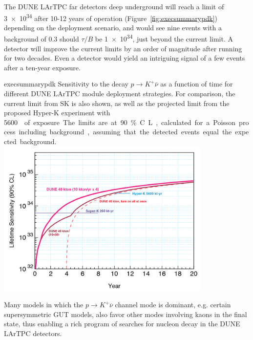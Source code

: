 The DUNE LArTPC far detectors deep underground will reach a limit of
\SI{3e34}{\year} after 10-12 years of operation
(Figure~\ref{fig:execsummarypdk}) depending on the deployment
scenario, and would see nine events with a background of 0.3 should
$\tau/B$ be \SI{1e34}{\year}, just beyond the current limit. A
 detector will improve the current limits by an order of
magnitude after running for two decades. Even a  detector
would yield an intriguing signal of a few events after a ten-year
exposure.


\begin{cdrfigure}{execsummarypdk} {Sensitivity to the
    decay $p\to K^+ \bar{\nu}$ as a function of time for different DUNE 
LArTPC module deployment strategies. 
  For comparison, the current limit from SK is also shown, as well as the projected limit from the proposed Hyper-K experiment with \SI{5600}\ktyr{} of exposure.
  The limits are at 90\% C.L., calculated for
  a Poisson process including background, assuming that the detected events
  equal the expected background.}
\includegraphics[width=0.8\textwidth]{volume-physics/figures/lar4x10.png}
\end{cdrfigure}

Many models in which the $p\to K^+\overline{\nu}$ channel mode is
dominant, e.g. certain supersymmetric GUT models, also favor other
modes involving kaons in the final state, thus enabling a rich program
of searches for nucleon decay in the DUNE LArTPC detectors.


